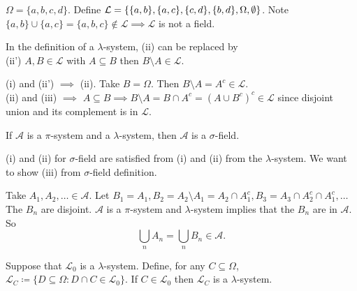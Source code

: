 \documentclass[class=article,crop=false]{standalone}
\begin{document}
\begin{notation}
	
\end{notation}

\begin{eg}[]
	$ \Omega = \{a,b,c,d\} $. Define $ \mathcal{L} = \{\{a,b\} ,\{a,c\} ,\{c,d\} ,\{b,d\} ,\Omega, \emptyset\} $. Note $ \{a,b\} \cup \{a,c\} = \{a,b,c\} \not\in \mathcal{L} \implies \mathcal{L}$ is not a field.
\end{eg}


In the definition of a $\lambda$-system, (ii) can be replaced by\\
(ii') $ A,B \in \mathcal{L}$ with $ A \subseteq B$ then $ B\setminus A \in \mathcal{L} $.

\begin{prf}
	(i) and (ii')  $ \implies$ (ii). Take $ B = \Omega$. Then $ B \setminus A = A^{c} \in \mathcal{L}$.\\

	(ii) and (iii) $ \implies$ $ A \subseteq B \implies B\setminus A = B \cap A^{c} = (A \cup B^{c})^{c} \in \mathcal{L}$ since disjoint union and its complement is in $ \mathcal{L}$.
\end{prf}

\begin{lem}[1]
If $ \mathcal{A}$ is a $\pi$-system and a $\lambda$-system, then $ \mathcal{A}$ is a $\sigma$-field.
\end{lem}

\begin{prf}
	(i) and (ii) for  $\sigma$-field are satisfied from (i) and (ii) from the $\lambda$-system. We want to show (iii) from $\sigma$-field definition.

	Take $ A_1,A_2,\ldots \in \mathcal{A}$. Let $ B_1=A_1, B_2=A_2 \setminus A_1 = A_2 \cap A_1^{c}, B_3 = A_3 \cap A_2^{c} \cap A_1^{c},\ldots$ The $ B_n$ are disjoint. $ \mathcal{A}$ is a $\pi$-system and $\lambda$-system implies that the $ B_n$ are in $ \mathcal{A}$. So
	\[
	\bigcup_{ n} A_n = \bigcup_{ n} B_n \in \mathcal{A}  
	.\] 
\end{prf}

\begin{lem}[2]
	Suppose that $ \mathcal{L}_0$ is a $\lambda$-system. Define, for any $ C \subseteq \Omega$, $ \mathcal{L}_C \coloneq \{D \subseteq \Omega : D \cap  C \in \mathcal{L}_0\} $. If $ C \in \mathcal{L}_0$ then $ \mathcal{L}_C$ is a $\lambda$-system.
\end{lem}
\end{document}
